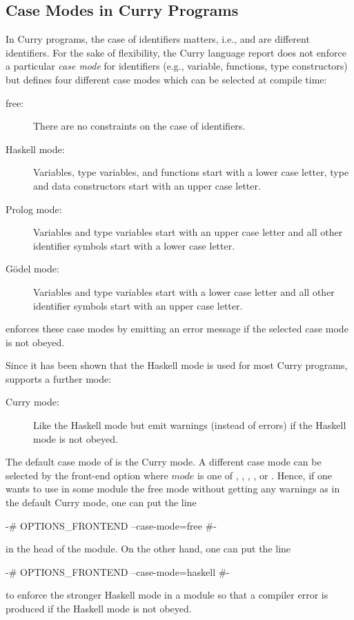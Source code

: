 \subsection{Case Modes in Curry Programs}

In Curry programs, the case of identifiers matters,
i.e.,  and  are different identifiers.
For the sake of flexibility, the Curry language report
does not enforce a particular \emph{case mode}
for identifiers (e.g., variable, functions, type constructors)
but defines four different case modes which can be
selected at compile time:
%
\begin{description}
\item[free:]
There are no constraints on the case of identifiers.
\item[Haskell mode:]
Variables, type variables, and functions start with a lower case letter,
type and data constructors start with an upper case letter.
\item[Prolog mode:]
Variables and type variables start with an upper case letter and
all other identifier symbols start with a lower case letter.
\item[G\"odel mode:]
Variables and type variables start with a lower case letter and
all other identifier symbols start with an upper case letter.
\end{description}
%
\CYS enforces these case modes by emitting an error message
if the selected case mode is not obeyed.

Since it has been shown that the Haskell mode is used for most
Curry programs, \CYS supports a further mode:
%
\begin{description}
\item[Curry mode:]
Like the Haskell mode but emit warnings (instead of errors)
if the Haskell mode is not obeyed.
\end{description}
%
The default case mode of \CYS is the Curry mode.
A different case mode can be selected by the front-end option
 where $\mathit{mode}$
is one of , , , ,
or .
Hence, if one wants to use in some module
the free mode without getting any warnings
as in the default Curry mode, one can put the line
%
\begin{curry}
{-# OPTIONS_FRONTEND --case-mode=free #-}
\end{curry}
%
in the head of the module.
On the other hand, one can put the line
%
\begin{curry}
{-# OPTIONS_FRONTEND --case-mode=haskell #-}
\end{curry}
%
to enforce the stronger Haskell mode in a module so that
a compiler error is produced if the Haskell mode is not obeyed.


